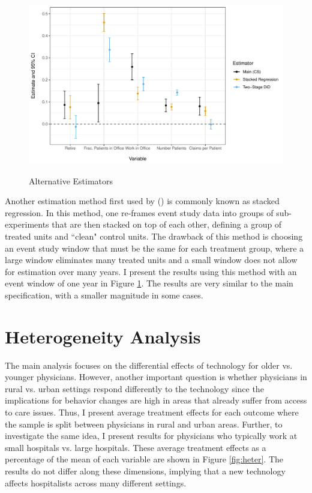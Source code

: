 \documentclass[12pt]{article}
\begin{document}
\begin{figure}
    \centering
    \caption{Alternative Estimators}
    \includegraphics[scale=.6]{Objects/estimators_plot.pdf}
    \label{fig:estimators}
\end{figure}

Another estimation method first used by \citeauthor{cengiz2019effect} (\citeyear{cengiz2019effect}) is commonly known as stacked regression. In this method, one re-frames event study data into groups of sub-experiments that are then stacked on top of each other, defining a group of treated units and ``clean" control units. The drawback of this method is choosing an event study window that must be the same for each treatment group, where a large window eliminates many treated units and a small window does not allow for estimation over many years. I present the results using this method with an event window of one year in Figure \ref{fig:estimators}. The results are very similar to the main specification, with a smaller magnitude in some cases. 





\section{Heterogeneity Analysis}

The main analysis focuses on the differential effects of technology for older vs. younger physicians. However, another important question is whether physicians in rural vs. urban settings respond differently to the technology since the implications for behavior changes are high in areas that already suffer from access to care issues. Thus, I present average treatment effects for each outcome where the sample is split between physicians in rural and urban areas. Further, to investigate the same idea, I present results for physicians who typically work at small hospitals vs. large hospitals. These average treatment effects as a percentage of the mean of each variable are shown in Figure \ref{fig:heter}. The results do not differ along these dimensions, implying that a new technology affects hospitalists across many different settings. 
\end{document}
